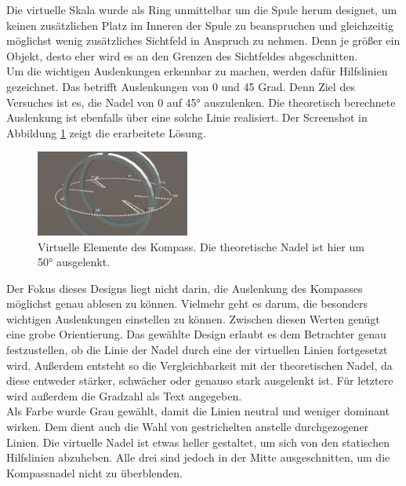 Die virtuelle Skala wurde als Ring unmittelbar um die Spule herum designet, um keinen zusätzlichen Platz im Inneren der Spule zu beanspruchen und gleichzeitig möglichst wenig zusätzliches Sichtfeld in Anspruch zu nehmen. Denn je größer ein Objekt, desto eher wird es an den Grenzen des Sichtfeldes abgeschnitten.\\
\noindent\hspace*{5mm}
Um die wichtigen Auslenkungen erkennbar zu machen, werden dafür Hilfslinien gezeichnet. Das betrifft Auslenkungen von 0 und 45 Grad. Denn Ziel des Versuches ist es, die Nadel von 0 auf 45° auszulenken. Die theoretisch berechnete Auslenkung ist ebenfalls über eine solche Linie realisiert. Der Screenshot in Abbildung \ref{img:compass} zeigt die erarbeitete Lösung.\\

\begin{figure}
	\centering
	\includegraphics[width=0.45\textwidth]{images/unity/compass.jpg}
	\caption{Virtuelle Elemente des Kompass. Die theoretische Nadel ist hier um 50° ausgelenkt.}
	\label{img:compass}
\end{figure}

Der Fokus dieses Designs liegt nicht darin, die Auslenkung des Kompasses möglichst genau ablesen zu können. Vielmehr geht es darum, die besonders wichtigen Auslenkungen einstellen zu können. Zwischen diesen Werten genügt eine grobe Orientierung. Das gewählte Design erlaubt es dem Betrachter genau festzustellen, ob die Linie der Nadel durch eine der virtuellen Linien fortgesetzt wird. Außerdem entsteht so die Vergleichbarkeit mit der theoretischen Nadel, da diese entweder stärker, schwächer oder genauso stark ausgelenkt ist. Für letztere wird außerdem die Gradzahl als Text angegeben.\\
\noindent\hspace*{5mm}
Als Farbe wurde Grau gewählt, damit die Linien neutral und weniger dominant wirken. Dem dient auch die Wahl von gestrichelten anstelle durchgezogener Linien. Die virtuelle Nadel ist etwas heller gestaltet, um sich von den statischen Hilfslinien abzuheben. Alle drei sind jedoch in der Mitte ausgeschnitten, um die Kompassnadel nicht zu überblenden.\\

